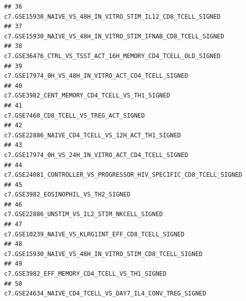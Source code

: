 \documentclass{article}\usepackage[]{graphicx}\usepackage[]{color}
\makeatletter
\newenvironment{kframe}{%
 \def\at@end@of@kframe{}%
 \ifinner\ifhmode%
  \def\at@end@of@kframe{\end{minipage}}%
  \begin{minipage}{\columnwidth}%
 \fi\fi%
 \def\FrameCommand##1{\hskip\@totalleftmargin \hskip-\fboxsep
 \colorbox{shadecolor}{##1}\hskip-\fboxsep
     \hskip-\linewidth \hskip-\@totalleftmargin \hskip\columnwidth}%
 \MakeFramed {\advance\hsize-\width
   \@totalleftmargin\z@ \linewidth\hsize
   \@setminipage}}%
 {\par\unskip\endMakeFramed%
 \at@end@of@kframe}
\newenvironment{knitrout}{}{} %
\makeatother
\begin{document}
\begin{knitrout}
\begin{kframe}
\begin{verbatim}
## 36                                                                                                                       c7.GSE15930_NAIVE_VS_48H_IN_VITRO_STIM_IL12_CD8_TCELL_SIGNED
## 37                                                                                                                      c7.GSE15930_NAIVE_VS_48H_IN_VITRO_STIM_IFNAB_CD8_TCELL_SIGNED
## 38                                                                                                                       c7.GSE36476_CTRL_VS_TSST_ACT_16H_MEMORY_CD4_TCELL_OLD_SIGNED
## 39                                                                                                                                c7.GSE17974_0H_VS_48H_IN_VITRO_ACT_CD4_TCELL_SIGNED
## 40                                                                                                                                     c7.GSE3982_CENT_MEMORY_CD4_TCELL_VS_TH1_SIGNED
## 41                                                                                                                                            c7.GSE7460_CD8_TCELL_VS_TREG_ACT_SIGNED
## 42                                                                                                                                  c7.GSE22886_NAIVE_CD4_TCELL_VS_12H_ACT_TH1_SIGNED
## 43                                                                                                                                c7.GSE17974_0H_VS_24H_IN_VITRO_ACT_CD4_TCELL_SIGNED
## 44                                                                                                                 c7.GSE24081_CONTROLLER_VS_PROGRESSOR_HIV_SPECIFIC_CD8_TCELL_SIGNED
## 45                                                                                                                                                c7.GSE3982_EOSINOPHIL_VS_TH2_SIGNED
## 46                                                                                                                                       c7.GSE22886_UNSTIM_VS_IL2_STIM_NKCELL_SIGNED
## 47                                                                                                                                 c7.GSE10239_NAIVE_VS_KLRG1INT_EFF_CD8_TCELL_SIGNED
## 48                                                                                                                            c7.GSE15930_NAIVE_VS_48H_IN_VITRO_STIM_CD8_TCELL_SIGNED
## 49                                                                                                                                      c7.GSE3982_EFF_MEMORY_CD4_TCELL_VS_TH1_SIGNED
## 50                                                                                                                           c7.GSE24634_NAIVE_CD4_TCELL_VS_DAY7_IL4_CONV_TREG_SIGNED

\end{verbatim}
\end{kframe}
\end{knitrout}
\end{document}
